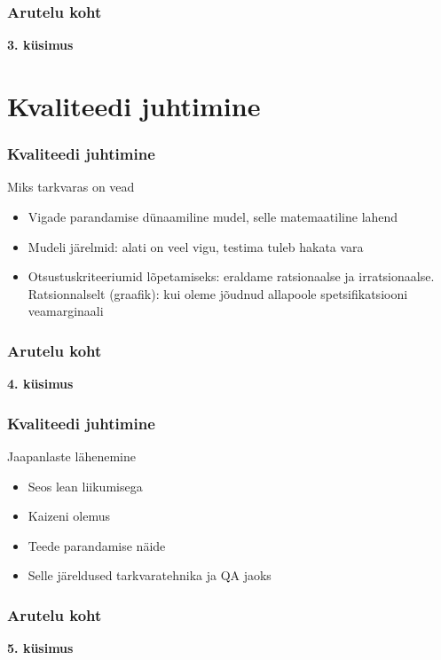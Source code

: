 \begin{frame}[fragile]
  \frametitle{Arutelu koht}
		\begin{center}
			\textbf{3. küsimus}
		\end{center}
\end{frame}

\section{Kvaliteedi juhtimine}

\begin{frame}[fragile]
  \frametitle{Kvaliteedi juhtimine}
	Miks tarkvaras on vead
	\begin{itemize}
		\item Vigade parandamise dünaamiline mudel, selle matemaatiline lahend
		\item Mudeli järelmid: alati on veel vigu, testima tuleb hakata vara
		\item Otsustuskriteeriumid lõpetamiseks: eraldame ratsionaalse ja irratsionaalse. Ratsionnalselt (graafik): kui oleme jõudnud allapoole spetsifikatsiooni veamarginaali
	\end{itemize}
\end{frame}

\begin{frame}[fragile]
  \frametitle{Arutelu koht}
		\begin{center}
			\textbf{4. küsimus}
		\end{center}
\end{frame}

\begin{frame}[fragile]
  \frametitle{Kvaliteedi juhtimine}
	Jaapanlaste lähenemine
	\begin{itemize}
		\item Seos lean liikumisega
		\item Kaizeni olemus
		\item Teede parandamise näide
		\item Selle järeldused tarkvaratehnika ja QA jaoks
	\end{itemize}
\end{frame}

\begin{frame}[fragile]
  \frametitle{Arutelu koht}
		\begin{center}
			\textbf{5. küsimus}
		\end{center}
\end{frame}


